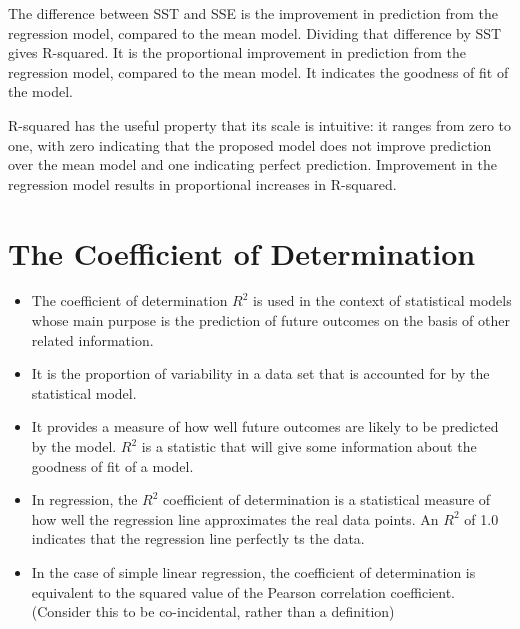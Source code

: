 \documentclass[]{report}
\begin{document}
The difference between SST and SSE is the improvement in prediction from the regression model, compared to the mean model. Dividing that difference by SST gives R-squared. It is the proportional improvement in prediction from the regression model, compared to the mean model. It indicates the goodness of fit of the model.

R-squared has the useful property that its scale is intuitive: it ranges from zero to one, with zero indicating that the proposed model does not improve prediction over the mean model and one indicating perfect prediction. Improvement in the regression model results in proportional increases in R-squared.

\newpage
\section*{The Coefficient of Determination}
\begin{itemize}
	\item 

The coefficient of determination $R^2$ is used in the context of statistical models whose main
purpose is the prediction of future outcomes on the basis of other related information. \item It is the
proportion of variability in a data set that is accounted for by the statistical model. \item It provides
a measure of how well future outcomes are likely to be predicted by the model.
$R^2$ is a statistic that will give some information about the goodness of fit of a model.
\item  In
regression, the $R^2$ coefficient of determination is a statistical measure of how well the regression
line approximates the real data points. An $R^2$ of 1.0 indicates that the regression line perfectly
ts the data.
\item In the case of simple linear regression, the coefficient of determination is equivalent to the
squared value of the Pearson correlation coefficient. (Consider this to be co-incidental, rather
than a definition)
\end{itemize}
\end{document}
